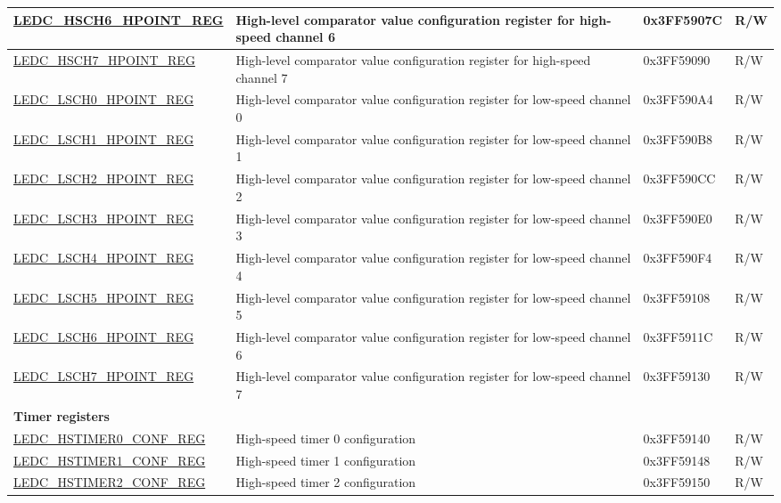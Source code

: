 \begin{longtable}{ | p{4.7cm} | p{7.3cm} | p{2cm} | p{1cm} | }
\hyperref[regdesc:LEDCHSCHnHPOINTREG]{LEDC\_HSCH6\_HPOINT\_REG} & High-level comparator value configuration register for high-speed channel 6 & 0x3FF5907C & R/W\\ \hline
\hyperref[regdesc:LEDCHSCHnHPOINTREG]{LEDC\_HSCH7\_HPOINT\_REG} & High-level comparator value configuration register for high-speed channel 7 & 0x3FF59090 & R/W\\ \hline
\hyperref[regdesc:LEDCLSCHnHPOINTREG]{LEDC\_LSCH0\_HPOINT\_REG} & High-level comparator value configuration register for low-speed channel 0 & 0x3FF590A4 & R/W\\ \hline
\hyperref[regdesc:LEDCLSCHnHPOINTREG]{LEDC\_LSCH1\_HPOINT\_REG} & High-level comparator value configuration register for low-speed channel 1 & 0x3FF590B8 & R/W\\ \hline
\hyperref[regdesc:LEDCLSCHnHPOINTREG]{LEDC\_LSCH2\_HPOINT\_REG} & High-level comparator value configuration register for low-speed channel 2 & 0x3FF590CC & R/W\\ \hline
\hyperref[regdesc:LEDCLSCHnHPOINTREG]{LEDC\_LSCH3\_HPOINT\_REG} & High-level comparator value configuration register for low-speed channel 3 & 0x3FF590E0 & R/W\\ \hline
\hyperref[regdesc:LEDCLSCHnHPOINTREG]{LEDC\_LSCH4\_HPOINT\_REG} & High-level comparator value configuration register for low-speed channel 4 & 0x3FF590F4 & R/W\\ \hline
\hyperref[regdesc:LEDCLSCHnHPOINTREG]{LEDC\_LSCH5\_HPOINT\_REG} & High-level comparator value configuration register for low-speed channel 5 & 0x3FF59108 & R/W\\ \hline
\hyperref[regdesc:LEDCLSCHnHPOINTREG]{LEDC\_LSCH6\_HPOINT\_REG} & High-level comparator value configuration register for low-speed channel 6 & 0x3FF5911C & R/W\\ \hline
\hyperref[regdesc:LEDCLSCHnHPOINTREG]{LEDC\_LSCH7\_HPOINT\_REG} & High-level comparator value configuration register for low-speed channel 7 & 0x3FF59130 & R/W\\ \hline
\multicolumn{4}{|l|}{\textbf{Timer registers}} \\\hline
\hyperref[regdesc:LEDCHSTIMERnCONFREG]{LEDC\_HSTIMER0\_CONF\_REG} & High-speed timer 0 configuration & 0x3FF59140 & R/W \\\hline
\hyperref[regdesc:LEDCHSTIMERnCONFREG]{LEDC\_HSTIMER1\_CONF\_REG} & High-speed timer 1 configuration & 0x3FF59148 & R/W \\\hline
\hyperref[regdesc:LEDCHSTIMERnCONFREG]{LEDC\_HSTIMER2\_CONF\_REG} & High-speed timer 2 configuration & 0x3FF59150 & R/W \\\hline

\end{longtable}
